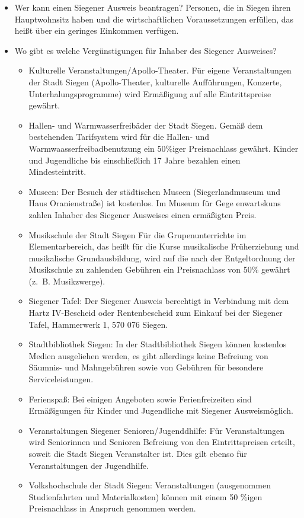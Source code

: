 \begin{itemize}
	\item Wer kann einen Siegener Ausweis beantragen? Personen, die in Siegen ihren Hauptwohnsitz haben und die wirtschaftlichen Voraussetzungen erfüllen, das heißt über ein geringes Einkommen verfügen. 
	\item Wo gibt es welche Vergünstigungen für Inhaber des Siegener Ausweises? 
	\begin{itemize}
		\item Kulturelle Veranstaltungen/Apollo-Theater. Für eigene Veranstaltungen der Stadt Siegen (Apollo-Theater, kulturelle Aufführungen, Konzerte, Unterhalungsprogramme) wird Ermäßigung auf alle Eintrittspreise gewährt.
		\item Hallen- und Warmwasserfreibäder der Stadt Siegen. Gemäß dem bestehenden Tarifsystem wird für die Hallen- und Warmwaasserfreibadbenutzung ein 50\%iger Preisnachlass gewährt. Kinder und Jugendliche bis einschließlich 17 Jahre bezahlen einen Mindesteintritt. 
		\item Museen: Der Besuch der städtischen Museen (Siegerlandmuseum und Haus Oranienstraße) ist kostenlos. Im Museum für Gege enwartskuns zahlen Inhaber des Siegener Ausweises einen ermäßigten Preis.
		\item Musikschule der Stadt Siegen Für die Grupenunterrichte im Elementarbereich, das heißt für die Kurse musikalische Früherziehung und musikalische Grundausbildung, wird auf die nach der Entgeltordnung der Musikschule zu zahlenden Gebühren ein Preisnachlass von 50\% gewährt (z.~B. Musikzwerge). 
		\item Siegener Tafel: Der Siegener Ausweis berechtigt in Verbindung mit dem Hartz IV-Bescheid oder Rentenbescheid zum Einkauf bei der Siegener Tafel, Hammerwerk 1, 570 076 Siegen. 
		\item Stadtbibliothek Siegen: In der Stadtbibliothek Siegen können kostenlos  Medien ausgeliehen werden, es gibt allerdings keine Befreiung von Säumnis- und Mahngebühren sowie von Gebühren für besondere Serviceleistungen. 
		\item Ferienspaß: Bei einigen Angeboten sowie Ferienfreizeiten sind Ermäßigungen für Kinder und Jugendliche mit Siegener 
		Ausweismöglich. 
		\item Veranstaltungen Siegener Senioren/Jugenddhilfe: Für Veranstaltungen wird Seniorinnen und Senioren Befreiung von den  Eintrittspreisen erteilt, soweit die Stadt Siegen Veranstalter ist. Dies gilt ebenso für Veranstaltungen der Jugendhilfe. 
		\item Volkshochschule der Stadt Siegen: Veranstaltungen (ausgenommen Studienfahrten und Materialkosten) können mit einem 50 \%igen Preisnachlass in Anspruch genommen werden.

\end{itemize}
\end{itemize}

